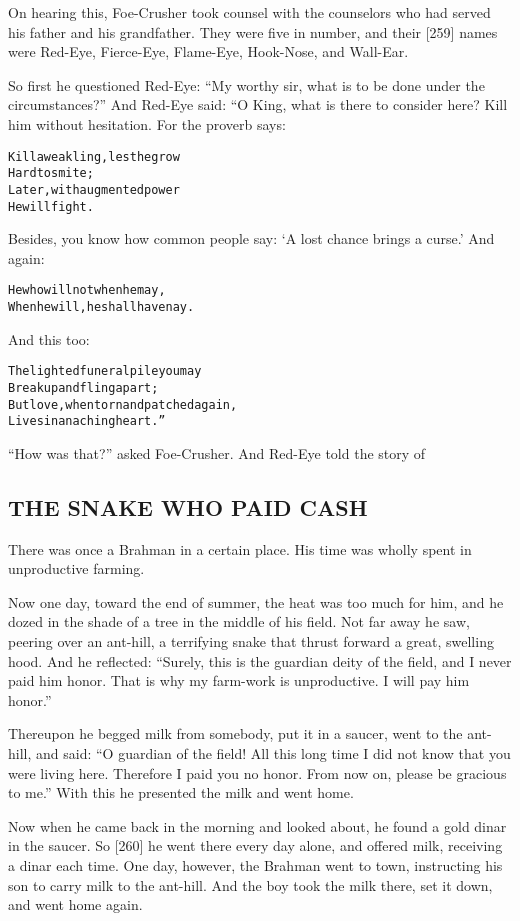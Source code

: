 \documentclass{article}
\renewenvironment{verbatim}{\begin{alltt}\normalfont\begin{centering}}{\end{centering}\end{alltt}}
\begin{document}
On hearing this, Foe-Crusher took counsel with the counselors who
had served his father and his grandfather. They were five in
number, and their [259] names were Red-Eye, Fierce-Eye, Flame-Eye,
Hook-Nose, and Wall-Ear.

So first he questioned Red-Eye:
``My worthy sir, what is to be done under the circumstances?'' And
Red-Eye said: “O King, what is there to consider here? Kill him
without hesitation. For the proverb says:

\begin{verbatim}
Kill a weakling, lest he grow
    Hard to smite;
Later, with augmented power
    He will fight.
\end{verbatim}
Besides, you know how common people say:
`A lost chance brings a curse.' And again:

\begin{verbatim}
He who will not when he may,
When he will, he shall have nay.
\end{verbatim}
And this too:

\begin{verbatim}
The lighted funeral pile you may
    Break up and fling apart;
But love, when torn and patched again,
    Lives in an aching heart.”
\end{verbatim}
``How was that?'' asked Foe-Crusher. And Red-Eye told the story of

\subsection{THE SNAKE WHO PAID CASH}

There was once a Brahman in a certain place. His time was wholly
spent in unproductive farming.

Now one day, toward the end of summer, the heat was too much for
him, and he dozed in the shade of a tree in the middle of his
field. Not far away he saw, peering over an ant-hill, a terrifying
snake that thrust forward a great, swelling hood. And he reflected:
``Surely, this is the guardian deity of the field, and I never paid him honor. That is why my farm-work is unproductive. I will pay him honor.''

Thereupon he begged milk from somebody, put it in a saucer, went to
the ant-hill, and said:
``O guardian of the field! All this long time I did not know that you were living here. Therefore I paid you no honor. From now on, please be gracious to me.''
With this he presented the milk and went home.

Now when he came back in the morning and looked about, he found a
gold dinar in the saucer. So [260] he went there every day alone,
and offered milk, receiving a dinar each time. One day, however,
the Brahman went to town, instructing his son to carry milk to the
ant-hill. And the boy took the milk there, set it down, and went
home again.
\end{document}
